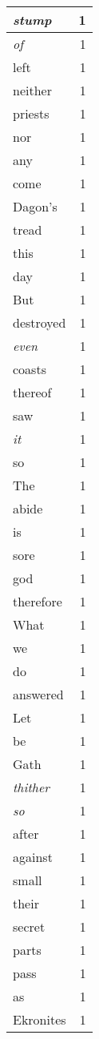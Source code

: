 \begin{center}
\begin{longtable}{l|r}
\emph{stump} & 1 \\ \hline
\emph{of} & 1 \\ \hline
left & 1 \\ \hline
neither & 1 \\ \hline
priests & 1 \\ \hline
nor & 1 \\ \hline
any & 1 \\ \hline
come & 1 \\ \hline
Dagon's & 1 \\ \hline
tread & 1 \\ \hline
this & 1 \\ \hline
day & 1 \\ \hline
But & 1 \\ \hline
destroyed & 1 \\ \hline
\emph{even} & 1 \\ \hline
coasts & 1 \\ \hline
thereof & 1 \\ \hline
saw & 1 \\ \hline
\emph{it} & 1 \\ \hline
so & 1 \\ \hline
The & 1 \\ \hline
abide & 1 \\ \hline
is & 1 \\ \hline
sore & 1 \\ \hline
god & 1 \\ \hline
therefore & 1 \\ \hline
What & 1 \\ \hline
we & 1 \\ \hline
do & 1 \\ \hline
answered & 1 \\ \hline
Let & 1 \\ \hline
be & 1 \\ \hline
Gath & 1 \\ \hline
\emph{thither} & 1 \\ \hline
\emph{so} & 1 \\ \hline
after & 1 \\ \hline
against & 1 \\ \hline
small & 1 \\ \hline
their & 1 \\ \hline
secret & 1 \\ \hline
parts & 1 \\ \hline
pass & 1 \\ \hline
as & 1 \\ \hline
Ekronites & 1 \\ \hline

\end{longtable}
\end{center}
